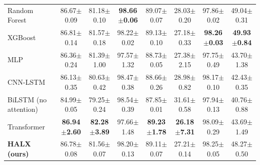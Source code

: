 \begin{tabular}{@{}l@{\hspace{3pt}}ccccccc@{}}
Random Forest~\cite{breiman2001rf} & 86.67{\tiny$\pm$0.09} & 81.18{\tiny$\pm$0.10} & \textbf{98.66{\tiny$\pm$0.06}} & 89.07{\tiny$\pm$0.07} & 28.03{\tiny$\pm$0.20} & 97.86{\tiny$\pm$0.02} & 49.04{\tiny$\pm$0.31} \\
XGBoost~\cite{chen2016xgboost} & 86.81{\tiny$\pm$0.14} & 81.57{\tiny$\pm$0.18} & 98.22{\tiny$\pm$0.02} & 89.13{\tiny$\pm$0.10} & 27.18{\tiny$\pm$0.33} & \textbf{98.26{\tiny$\pm$0.03}} & \textbf{49.93{\tiny$\pm$0.84}} \\
MLP & 86.36{\tiny$\pm$0.24} & 81.39{\tiny$\pm$1.00} & 97.57{\tiny$\pm$1.32} & 88.73{\tiny$\pm$0.05} & 27.38{\tiny$\pm$2.15} & 97.75{\tiny$\pm$0.49} & 43.70{\tiny$\pm$1.38} \\
CNN-LSTM~\cite{halbouni2022cnnlstm} & 86.13{\tiny$\pm$0.35} & 80.63{\tiny$\pm$0.42} & 98.47{\tiny$\pm$0.38} & 88.66{\tiny$\pm$0.26} & 28.98{\tiny$\pm$0.82} & 98.17{\tiny$\pm$0.10} & 42.43{\tiny$\pm$0.35} \\
BiLSTM (no attention) & 84.99{\tiny$\pm$0.05} & 79.25{\tiny$\pm$0.24} & 98.54{\tiny$\pm$0.39} & 87.85{\tiny$\pm$0.01} & 31.61{\tiny$\pm$0.58} & 97.94{\tiny$\pm$0.13} & 40.76{\tiny$\pm$0.88} \\
Transformer~\cite{gorishniy2021revisiting} & \textbf{86.94{\tiny$\pm$2.60}} & \textbf{82.28{\tiny$\pm$3.89}} & 97.66{\tiny$\pm$1.48} & \textbf{89.23{\tiny$\pm$1.78}} & \textbf{26.18{\tiny$\pm$7.31}} & 98.09{\tiny$\pm$0.29} & 43.69{\tiny$\pm$1.49} \\
\textbf{HALX (ours)} & 86.78{\tiny$\pm$0.08} & 81.56{\tiny$\pm$0.07} & 98.20{\tiny$\pm$0.13} & 89.11{\tiny$\pm$0.07} & 27.21{\tiny$\pm$0.14} & 98.25{\tiny$\pm$0.05} & 48.27{\tiny$\pm$0.50} \\
\bottomrule
\end{tabular}
